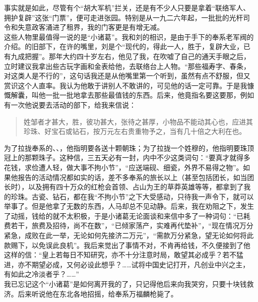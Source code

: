 事实就是如此，尽管有个“胡大军机”拦关，还是有不少人只要是拿着“联络军人、拥护复辟”这张“门票”，便可走进张园。特别是从一九二六年起，一批批的光杆司令和失意政客涌进了租界，我的门客更是有增无减。\\

这些人物里最值得一说的是“小诸葛”。我和刘的相识，是由于手下的奉系老军阀的介绍。的旧部下，在许的嘴里，刘是个“现代的，得此一人，胜于，复辟大业，已有九成把握”。那年大约四十岁左右，他见了我，在吹嘘了自己的通天手眼之后，立时建议我拿出些古玩字画和金表给他，去联络台上人物。“那些福寿字、春条，对这类人是不行的”，这句话我还是从他嘴里第一个听到，虽然有点不舒服，但又赏识这个人直率。我认为他敢于讲别人不敢讲的，可见他的话一定可靠。于是我慷慨解囊，叫他一批一批地拿去那些最值钱的东西。后来，他竟指名要这要那，例如有一次他说要去活动的部下，给我来信说：\\

\begin{quote}
	姓邹者才甚大，胜，彼功甚大，张待之甚厚，小物品不能动其心也，应进其珍珠、好宝石或钻石，按万元左右贵重物予之，当有几十倍之大利在也。\\
\end{quote}

为了拉拢奉系的、、，他指明要各送十颗朝珠；为了拉拢一个姓穆的，他指明要珠顶冠上的那颗珠子。这种信，三五天必有一封，内中不少这类词句：“要真才就得多花钱，求俭遭人轻，做大事不拘小节”，“应送端砚、细瓷，外界不易得之物”。如果他报告的活动情况都如实的话，差不多奉系的旅长以上（甚至包括团长，如当团长时），以及拥有四十万众的红枪会首领、占山为王的草莽英雄等等，都拿到了我的珍珠。古瓷、钻石，都在我“不拘小节”之下大受感动，只待我一声令下，就可以举事了。但是他拿了无数的东西，人马却总不见动静。后来，我在劝阻之下，发生了动摇，钱给的就不太积极，于是小诸葛无论面谈和来信中多了一种词句：“已耗费若干，旅费及招待，尚不在数”，“已倾家荡产，实难再代垫补”，“现在情况万分紧急，成败在此一举，无论如何先接济二万元”，“需款万分紧急，望无论如何将此款赐下，以免误此良机”。我后来觉出了事情不对，不肯再给钱，不久便接到了他这样的信：“皇上若每日不知研究，亦不十分注意时局，敢望其必成乎？若不猛进，亦不期望必成，又何必设此想乎？……试将中国史记打开，凡创业中兴之主，有如此之冷淡者乎？……”\\

我已忘记这个“小诸葛”是如何离开我的了，只记得他后来向我哭穷，只要十块钱救济。后来听说他在东北各地招摇，给奉系万福麟枪毙了。\\

